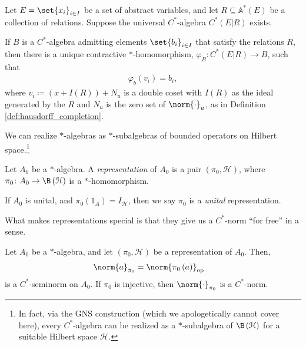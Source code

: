 \begin{proposition}\label{prop:universal_property_universal_cstar_algebra}
  Let $E = \set{x_i}_{i\in I}$ be a set of abstract variables, and let $R\subseteq \mathbb{A}^{\ast}\left( E \right)$ be a collection of relations. Suppose the universal $C^{\ast}$-algebra $C^{\ast}\left( E|R \right)$ exists.\newline

  If $B$ is a $C^{\ast}$-algebra admitting elements $\set{b_i}_{i\in I}$ that satisfy the relations $R$, then there is a unique contractive $\ast$-homomorphism, $\varphi_B\colon C^{\ast}\left( E|R \right) \rightarrow B$, such that
  \begin{align*}
    \varphi_b\left( v_i \right) = b_i,
  \end{align*}
  where $v_i \coloneq \left( x + I(R) \right) + N_u$ is a double coset with $I(R)$ as the ideal generated by the $R$ and $N_u$ is the zero set of $\norm{\cdot}_u$, as in Definition \ref{def:hausdorff_completion}.
\end{proposition}
We can realize $\ast$-algebras as $\ast$-subalgebras of bounded operators on Hilbert space.\footnote{In fact, via the GNS construction (which we apologetically cannot cover here), every $C^{\ast}$-algebra can be realized as a $\ast$-subalgebra of $\B\left( \mathcal{H} \right)$ for a suitable Hilbert space $\mathcal{H}$.} 
\begin{definition}\label{def:unital_representation}
  Let $A_0$ be a $\ast$-algebra. A \textit{representation} of $A_0$ is a pair $\left( \pi_0,\mathcal{H} \right)$, where $\pi_0\colon A_0\rightarrow \B\left( \mathcal{H} \right)$ is a $\ast$-homomorphism.\newline

  If $A_0$ is unital, and $\pi_0\left( 1_A \right) = I_{\mathcal{H}}$, then we say $\pi_0$ is a \textit{unital} representation.
\end{definition}
What makes representations special is that they give us a $C^{\ast}$-norm ``for free'' in a sense.
\begin{lemma}
  Let $A_0$ be a $\ast$-algebra, and let $\left( \pi_0,\mathcal{H} \right)$ be a representation of $A_0$. Then,
  \begin{align*}
    \norm{a}_{\pi_0} &= \norm{\pi_0\left( a \right)}_{\op}
  \end{align*}
  is a $C^{\ast}$-seminorm on $A_0$. If $\pi_0$ is injective, then $\norm{\cdot}_{\pi_0}$ is a $C^{\ast}$-norm.
\end{lemma}
